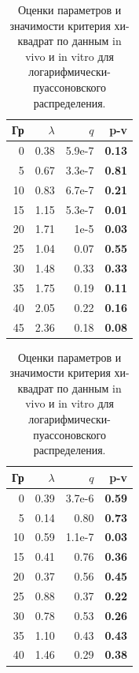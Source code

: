 \documentclass{math-mech-sci}
\begin{document}
	\begin{table}[!ht]
		\centering
		\footnotesize
		\begin{minipage}{0.4\textwidth}
			\centering
			\caption*{In vivo}
			\begin{tabular}{rrrr}
				\hline
				Гр & $\lambda$ & $q$ & \textbf{p-v} \\ 
				\hline
				0 & 0.38 & 5.9e-7 & \textbf{0.13} \\ 
				5 & 0.67 & 3.3e-7 & \textbf{0.81} \\ 
				10 & 0.83 & 6.7e-7 & \textbf{0.21} \\ 
				15 & 1.15 & 5.3e-7 & \textbf{0.01} \\ 
				20 & 1.71 & 1e-5 & \textbf{0.03} \\ 
				25 & 1.04 & 0.07 & \textbf{0.55} \\ 
				30 & 1.48 & 0.33 & \textbf{0.33} \\ 
				35 & 1.75 & 0.19 & \textbf{0.11} \\ 
				40 & 2.05 & 0.22 & \textbf{0.16} \\
				45 & 2.36 & 0.18 & \textbf{0.08} \\ 
				\hline
			\end{tabular}
			\label{tab:logpoisvivo}
		\end{minipage}
		\begin{minipage}{0.4\textwidth}
			\centering
			\caption*{In vitro}
			\begin{tabular}{rrrr}
				\hline
				Гр & $\lambda$ & $q$ & \textbf{p-v} \\ 
				\hline
				0 & 0.39 & 3.7e-6 & \textbf{0.59} \\ 
				5 & 0.14 & 0.80 & \textbf{0.73} \\ 
				10 & 0.59 & 1.1e-7 & \textbf{0.03} \\ 
				15 & 0.41 & 0.76 & \textbf{0.36} \\ 
				20 & 0.37 & 0.56 & \textbf{0.45} \\ 
				25 & 0.88 & 0.37 & \textbf{0.22} \\ 
				30 & 0.78 & 0.53 & \textbf{0.26} \\ 
				35 & 1.10 & 0.43 & \textbf{0.43} \\ 
				40 & 1.46 & 0.29 & \textbf{0.38} \\ 
				\hline
			\end{tabular}
			\label{tab:logpoisvitro}
		\end{minipage}
		\caption{Оценки параметров и значимости критерия хи-квадрат по данным in vivo и in vitro для логарифмически-пуассоновского распределения.}
		\label{tab:logpois}
	\end{table}
	
\end{document}
